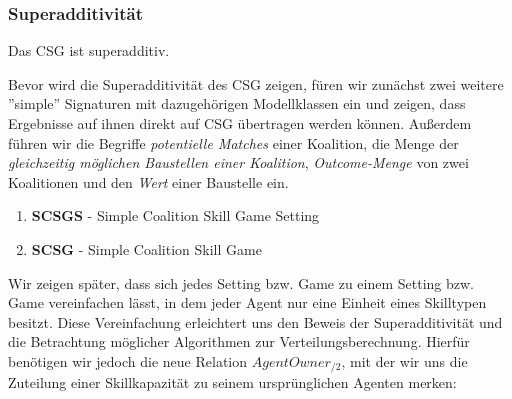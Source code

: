 \subsubsection{Superadditivität}
\label{supadd}
\begin{lemma}[Superadditivität]
Das CSG ist superadditiv.
\end{lemma}

Bevor wird die Superadditivität des CSG zeigen, füren wir zunächst zwei weitere ''simple'' Signaturen mit dazugehörigen Modellklassen ein und zeigen, dass Ergebnisse auf ihnen direkt auf CSG übertragen werden können. Außerdem führen wir die Begriffe \textit{potentielle Matches} einer Koalition, die Menge der \textit{gleichzeitig möglichen Baustellen einer Koalition}, \textit{Outcome-Menge} von zwei Koalitionen und den \textit{Wert} einer Baustelle ein.

\begin{enumerate}
  \item \textbf{SCSGS} - Simple Coalition Skill Game Setting
  \item \textbf{SCSG} - Simple Coalition Skill Game
\end{enumerate}

\noindent
Wir zeigen später, dass sich jedes Setting bzw. Game zu einem Setting bzw. Game vereinfachen lässt, in dem jeder Agent nur eine Einheit eines Skilltypen besitzt. Diese Vereinfachung erleichtert uns den Beweis der Superadditivität und die Betrachtung möglicher Algorithmen zur Verteilungsberechnung. Hierfür benötigen wir jedoch die neue Relation $AgentOwner_{/2}$, mit der wir uns die Zuteilung einer Skillkapazität zu seinem ursprünglichen Agenten merken:

